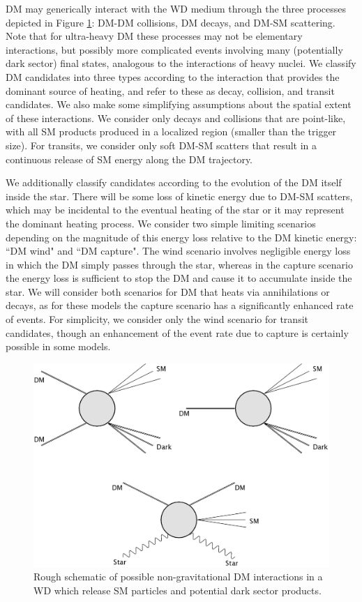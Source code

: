 \documentclass[twocolumn, preprintnumbers,amsmath,amssymb,prd, superscriptaddress]{revtex4}
\begin{document}
DM may generically interact with the WD medium through the three processes depicted in Figure \ref{fig:feynman}: DM-DM collisions, DM decays, and DM-SM scattering.
Note that for ultra-heavy DM these processes may not be elementary interactions, but possibly more complicated events involving many (potentially dark sector) final states, analogous to the interactions of heavy nuclei.
We classify DM candidates into three types according to the interaction that provides the dominant source of heating, and refer to these as decay, collision, and transit candidates.
We also make some simplifying assumptions about the spatial extent of these interactions.
We consider only decays and collisions that are point-like, with all SM products produced in a localized region (smaller than the trigger size).
For transits, we consider only soft DM-SM scatters that result in a continuous release of SM energy along the DM trajectory.

We additionally classify candidates according to the evolution of the DM itself inside the star.
There will be some loss of kinetic energy due to DM-SM scatters, which may be incidental to the eventual heating of the star or it may represent the dominant heating process.
We consider two simple limiting scenarios depending on the magnitude of this energy loss relative to the DM kinetic energy: ``DM wind" and ``DM capture".
The wind scenario involves negligible energy loss in which the DM simply passes through the star, whereas in the capture scenario the energy loss is sufficient to stop the DM and cause it to accumulate inside the star.
We will consider both scenarios for DM that heats via annihilations or decays, as for these models the capture scenario has a significantly enhanced rate of events.
For simplicity, we consider only the wind scenario for transit candidates, though an enhancement of the event rate due to capture is certainly possible in some models.

\begin{figure}
\includegraphics[scale=0.09]{feynmandiag.jpg}
\caption{Rough schematic of possible non-gravitational DM interactions in a WD which release SM particles and potential dark sector products.}
\label{fig:feynman}
\end{figure}
\end{document}
